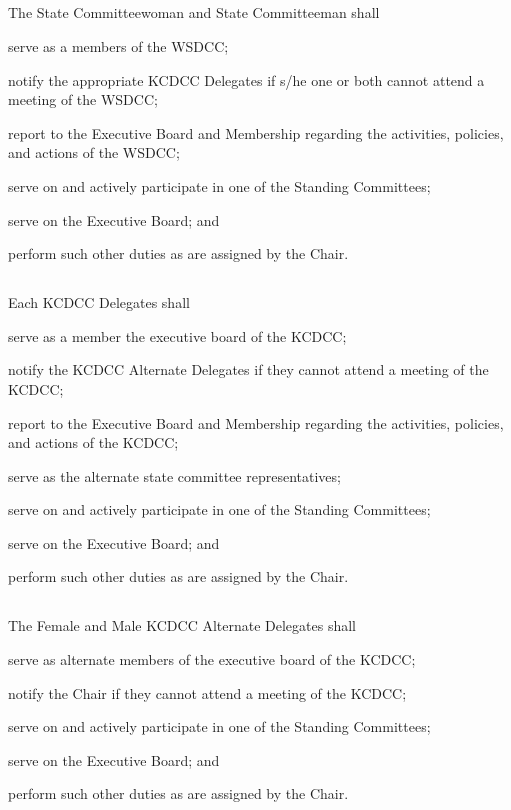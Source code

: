 \documentclass{article}
\begin{document}
\subsection{}
The State Committeewoman and State Committeeman shall
\begin{inlinealphalist}
    \item serve as a members of the WSDCC;
    \item notify the appropriate KCDCC Delegates if s/he one or both cannot attend a meeting of the WSDCC;
    \item report to the Executive Board and Membership regarding the activities, policies, and actions of the WSDCC;
    \item serve on and actively participate in one of the Standing Committees;
    \item serve on the Executive Board; and
    \item perform such other duties as are assigned by the Chair.
\end{inlinealphalist}

\subsection{}
Each KCDCC Delegates shall
\begin{inlinealphalist}
    \item serve as a member the executive board of the KCDCC;
    \item notify the KCDCC Alternate Delegates if they cannot attend a meeting of the KCDCC;
    \item report to the Executive Board and Membership regarding the activities, policies, and actions of the KCDCC;
    \item serve as the alternate state committee representatives;
    \item serve on and actively participate in one of the Standing Committees;
    \item serve on the Executive Board; and
    \item perform such other duties as are assigned by the Chair.
\end{inlinealphalist}

\subsection{}
The Female and Male KCDCC Alternate Delegates shall
\begin{inlinealphalist}
    \item serve as alternate members of the executive board of the KCDCC;
    \item notify the Chair if they cannot attend a meeting of the KCDCC;
    \item serve on and actively participate in one of the Standing Committees;
    \item serve on the Executive Board; and
    \item perform such other duties as are assigned by the Chair.
\end{inlinealphalist}
\end{document}
